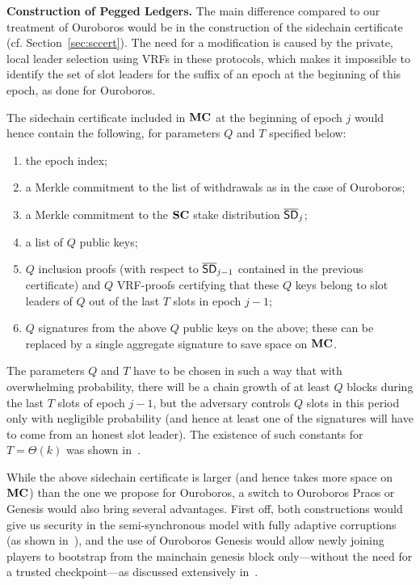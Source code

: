 \noindent
\textbf{Construction of Pegged Ledgers.}
The main difference compared to our treatment of Ouroboros
would be in the construction of the sidechain certificate
(cf. Section~\ref{sec:sccert}). The need for a modification is caused by the
private, local leader selection using VRFs in these protocols, which makes it
impossible to identify the set of slot leaders for the suffix of an epoch at the
beginning of this epoch, as done for Ouroboros.

The sidechain certificate included in $\mathbf{MC}$ at the beginning of epoch $j$
would hence contain the following, for parameters $Q$ and $T$ specified below:
\begin{enumerate}
\item
the epoch index;
\item
a Merkle commitment to the list of withdrawals as in the case of Ouroboros;
\item
a Merkle commitment to the $\mathbf{SC}$ stake distribution $\mathsf{\overline{SD}}_{j}$;
\item
a list of $Q$ public keys;
\item
$Q$ inclusion proofs (with respect to $\mathsf{\overline{SD}}_{j-1}$ contained in the previous
certificate) and $Q$ VRF-proofs certifying that these $Q$ keys belong
to slot leaders of $Q$ out of the last $T$ slots in epoch $j-1$;
\item
$Q$ signatures from the above $Q$ public keys on the above; these can be
replaced by a single aggregate signature to save space on $\mathbf{MC}$.
\end{enumerate}

The parameters $Q$ and $T$ have to be chosen in such a way that with
overwhelming probability, there will be a chain growth of at least $Q$ blocks
during the last $T$ slots of epoch $j-1$,
but the adversary controls $Q$ slots in this period only
with negligible probability (and hence at least one of the signatures will have
to come from an honest slot leader).
The existence of such constants for $T=\Theta(k)$ was shown in~\cite{genesis}.

While the above sidechain certificate is larger (and hence takes more space on
$\mathbf{MC}$) than the one we propose for Ouroboros, a switch to Ouroboros
Praos or Genesis would also bring several advantages. First off, both
constructions would give us security in the semi-synchronous model with fully
adaptive corruptions (as shown in~\cite{praos,genesis}),
and the use of
Ouroboros Genesis would allow newly joining players to bootstrap from the
mainchain genesis block only---without the need for a trusted checkpoint---as discussed
extensively in~\cite{genesis}.


